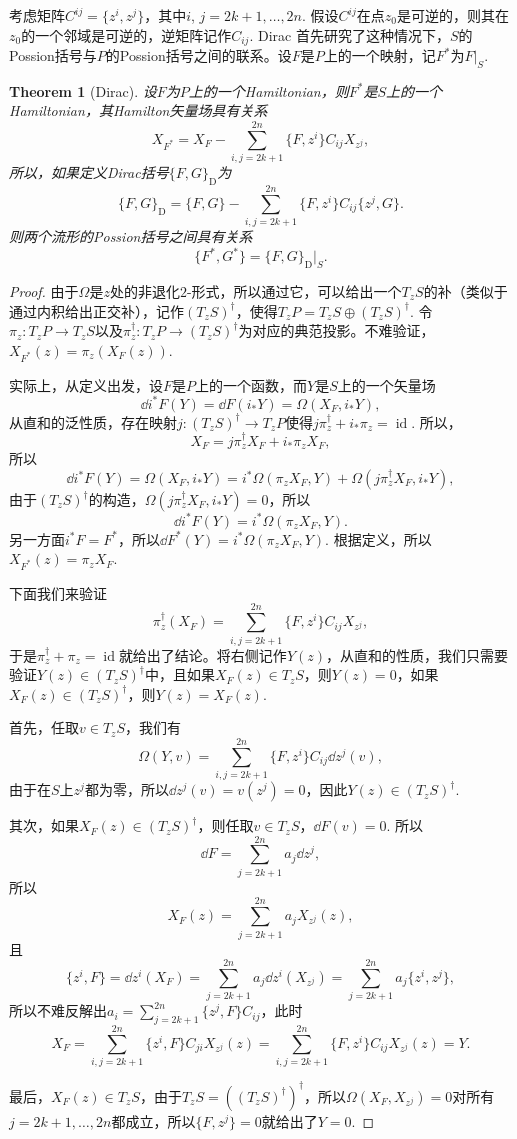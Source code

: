 \documentclass[11pt]{article}
\theoremstyle{definition}
\theoremstyle{plain}
\newtheorem{thm}[para]{Theorem}
\begin{document}
考虑矩阵$C^{ij}=\{z^i,z^j\}$，其中$i$, $j=2k+1,\dots,2n$. 假设$C^{ij}$在点$z_0$是可逆的，则其在$z_0$的一个邻域是可逆的，逆矩阵记作$C_{ij}$. Dirac 首先研究了这种情况下，$S$的Possion括号与$P$的Possion括号之间的联系。设$F$是$P$上的一个映射，记$F^*$为$F|_S$.

\begin{thm}[Dirac]
	设$F$为$P$上的一个Hamiltonian，则$F^*$是$S$上的一个Hamiltonian，其Hamilton矢量场具有关系
	\[X_{F^*}=X_F-\sum_{i,j=2k+1}^{2n}\{F,z^i\}C_{ij}X_{z^j},\]
	所以，如果定义Dirac括号$\{F,G\}_{\text{D}}$为
	\[\{F,G\}_{\mathrm{D}}=\{F,G\}-\sum_{i,j=2k+1}^{2n}\{F,z^i\}C_{ij}\{z^j,G\}.\]
	则两个流形的Possion括号之间具有关系
	\[\{F^*,G^*\}=\{F,G\}_{\mathrm{D}}|_S.\]
\end{thm}

\begin{proof}
	由于$\Omega$是$z$处的非退化$2$-形式，所以通过它，可以给出一个$T_zS$的补（类似于通过内积给出正交补），记作$(T_zS)^\dagger$，使得$T_zP=T_zS\oplus (T_zS)^\dagger$. 令$\pi_z:T_zP\to T_zS$以及$\pi^\dagger_z:T_zP\to (T_zS)^\dagger$为对应的典范投影。不难验证，$X_{F^*}(z)=\pi_z(X_{F}(z))$. 
	
	实际上，从定义出发，设$F$是$P$上的一个函数，而$Y$是$S$上的一个矢量场
	\[
		\dd i^*F(Y)=\dd F(i_*Y)=\Omega(X_F,i_*Y),
	\]
	从直和的泛性质，存在映射$j:(T_zS)^\dagger\to T_zP$使得$j\pi^\dagger_z+i_*\pi_z=\operatorname{id}$. 所以，
	\[
		X_F=j\pi^\dagger_zX_F+i_*\pi_zX_F,
	\]
	所以
	\[
		\dd i^*F(Y)=\Omega(X_F,i_*Y)=i^*\Omega(\pi_zX_F,Y)+\Omega(j\pi^\dagger_zX_F,i_*Y),
	\]
	由于$(T_zS)^\dagger$的构造，$\Omega(j\pi^\dagger_zX_F,i_*Y)=0$，所以
	\[
		\dd i^*F(Y)=i^*\Omega(\pi_zX_F,Y).
	\]
	另一方面$i^*F=F^*$，所以$\dd F^*(Y)=i^*\Omega(\pi_zX_F,Y)$. 根据定义，所以$X_{F^*}(z)=\pi_z X_{F}$.
	
	
	下面我们来验证
	\[
		\pi^\dagger_z(X_{F})=\sum_{i,j=2k+1}^{2n}\{F,z^i\}C_{ij}X_{z^j},
	\]
	于是$\pi^\dagger_z+\pi_z=\operatorname{id}$就给出了结论。将右侧记作$Y(z)$，从直和的性质，我们只需要验证$Y(z)\in (T_zS)^\dagger$中，且如果$X_F(z)\in T_zS$，则$Y(z)=0$，如果$X_F(z)\in (T_zS)^\dagger$，则$Y(z)=X_F(z)$.

	首先，任取$v\in T_zS$，我们有
	\[
		\Omega(Y,v)=\sum_{i,j=2k+1}^{2n}\{F,z^i\}C_{ij}\dd z^j(v),
	\]
	由于在$S$上$z^j$都为零，所以$\dd z^j(v)=v(z^j)=0$，因此$Y(z)\in (T_zS)^\dagger$.

	其次，如果$X_F(z)\in (T_zS)^\dagger$，则任取$v\in T_zS$，$\dd F(v)=0$. 所以
	\[
		\dd F=\sum_{j=2k+1}^{2n}a_j\dd z^j,
	\]
	所以
	\[
		X_F(z)=\sum_{j=2k+1}^{2n}a_jX_{z^j}(z),
	\]
	且
	\[
		\{z^i,F\}=\dd z^i(X_F)=\sum_{j=2k+1}^{2n}a_j\dd z^i(X_{z^j})=\sum_{j=2k+1}^{2n}a_j\{z^i,z^j\},
	\]
	所以不难反解出$a_i=\sum_{j=2k+1}^{2n}\{z^j,F\}C_{ij}$，此时
	\[
		X_F=\sum_{i,j=2k+1}^{2n}\{z^i,F\}C_{ji}X_{z^j}(z)=\sum_{i,j=2k+1}^{2n}\{F,z^i\}C_{ij}X_{z^j}(z)=Y.
	\]

	最后，$X_F(z)\in T_zS$，由于$T_zS=((T_zS)^\dagger)^\dagger$，所以$\Omega(X_F,X_{z^j})=0$对所有$j=2k+1,\dots,2n$都成立，所以$\{F,z^j\}=0$就给出了$Y=0$.
\end{proof}
\end{document}
